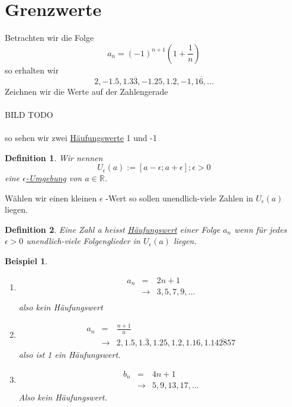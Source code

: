 \documentclass[a4paper,10pt]{report}
\newtheorem{mydef}{Definition}
\newtheorem{myexample}{Beispiel}
\newcommand{\R}{{\mathbb R}}
\begin{document}
\section{Grenzwerte}
Betrachten wir die Folge
\begin{equation*}a_n = (-1)^{n+1}(1+\frac{1}{n})\end{equation*}
so erhalten wir
\begin{equation*}
	2, -1.5,1.3\overline{3}, -1.25, 1.2,-1,1\overline{6}, \ldots
\end{equation*}
Zeichnen wir die Werte auf der Zahlengerade
\\\\ BILD TODO\\\\
so sehen wir zwei \underline{Häufungswerte} 1 und -1
\begin{mydef}Wir nennen
\begin{equation*}U_\epsilon(a) := [a-\epsilon; a + \epsilon]; \epsilon > 0\end{equation*}
eine \underline{$\epsilon$-Umgebung} von $a \in \R$.\end{mydef}
\noindent
Wählen wir einen kleinen $\epsilon$ -Wert so sollen unendlich-viele Zahlen in $U_\epsilon(a)$ liegen.
\begin{mydef}
	Eine Zahl a heisst \underline{Häufungswert} einer Folge $a_n$ wenn für jedes $\epsilon > 0$ unendlich-viele Folgenglieder in $U_{\epsilon}(a)$ liegen.
\end{mydef}
\begin{myexample}
\begin{enumerate}
	\item
	\begin{eqnarray}
	a_n &=& 2n + 1\\
	& \rightarrow& 3,5,7,9,\ldots\\
	\end{eqnarray}
	also kein Häufungswert
	\item 
	\begin{eqnarray}
	a_n & = & \frac{n+1}{n} \nonumber \\
	& \rightarrow & 2, 1.5, 1.\bar{3}, 1.25, 1.2, 1.16, 1.\bar{142857}\end{eqnarray}
	also ist 1 ein Häufungswert.
	\item \begin{eqnarray}b_n & = & 4n + 1 \nonumber \\
	& \rightarrow & 5, 9, 13, 17, ...\end{eqnarray}
	Also kein Häufungswert.
\end{enumerate}
\end{myexample}
\end{document}
